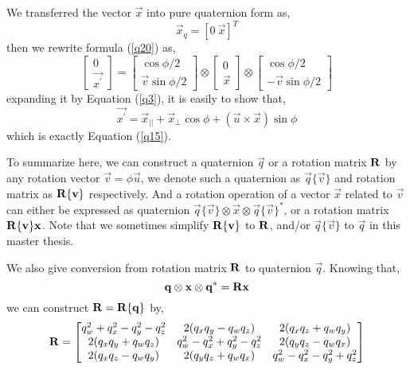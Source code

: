 We transferred the vector $\vec{x}$ into pure quaternion form as,
\begin{equation}\label{q21}
	\vec{x}_q = \left[0 \ \vec{x} \right]^T
\end{equation}
then we rewrite formula (\ref{q20}) as,
\begin{equation}\label{q22}
\begin{bmatrix}
0  \\ \vec{x^{\prime}} 
\end{bmatrix}
=
\begin{bmatrix}
\cos{\phi / 2}  \\ \vec{v}\sin{\phi / 2} 
\end{bmatrix}
\otimes
\begin{bmatrix}
0  \\ \vec{x} 
\end{bmatrix}
\otimes
\begin{bmatrix}
\cos{\phi / 2}  \\ -\vec{v}\sin{\phi / 2}  
\end{bmatrix}
\end{equation}
expanding it by Equation (\ref{q3}), it is easily to show that,
\begin{equation}\label{q23}
	\vec{x^{\prime}} = \vec{x}_{||} + \vec{x}_{\bot}\cos{\phi} + (\vec{u} \times \vec{x})\sin{\phi}
\end{equation}
which is exactly Equation (\ref{q15}).

To summarize here, we can construct a quaternion $\vec{q}$ or a rotation matrix $\mathbf{R}$ by any rotation vector $\vec{v} = \phi\vec{u}$, we denote such a quaternion as $\vec{q} \{ \vec{v} \}$ and rotation matrix as $\mathbf{R} \{ \mathbf{v} \}$ respectively. And a rotation operation of a vector $\vec{x}$ related to $\vec{v}$ can either be expressed as quaternion $\vec{q} \{ \vec{v} \} \otimes \vec{x} \otimes \vec{q} \{ \vec{v} \}^{*}$, or a rotation matrix $\mathbf{R} \{ \mathbf{v} \}\mathbf{x}$. Note that we sometimes simplify $\mathbf{R} \{ \mathbf{v} \}$ to $\mathbf{R}$, and/or $\vec{q} \{ \vec{v} \}$ to $\vec{q}$ in this master thesis.

We also give conversion from rotation matrix $\mathbf{R}$ to quaternion $\vec{q}$. Knowing that,
\begin{equation}\label{q24}
	\mathbf{q} \otimes \mathbf{x} \otimes \mathbf{q}^{*} = \mathbf{R}\mathbf{x}
\end{equation}
we can construct $\mathbf{R} = \mathbf{R} \{ \mathbf{q} \}$ by,
\begin{equation}\label{q25}
\mathbf{R} = \begin{bmatrix}
		q_w^2+q_x^2-q_y^2-q_z^2 & 2(q_xq_y-q_wq_z) & 2(q_xq_z+q_wq_y) \\
		2(q_xq_y+q_wq_z) & q_w^2-q_x^2+q_y^2-q_z^2 & 2(q_yq_z-q_wq_x)\\
		2(q_xq_z-q_wq_y) & 2(q_yq_z+q_wq_x) & q_w^2-q_x^2-q_y^2+q_z^2 \\
	  \end{bmatrix}
\end{equation} 

